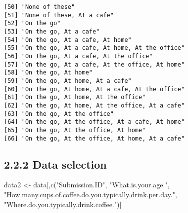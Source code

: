 \documentclass[
  letterpaper,
  DIV=11,
  numbers=noendperiod]{scrreprt}
\newenvironment{Shaded}{\begin{snugshade}}{\end{snugshade}}
\newcommand{\FunctionTok}[1]{\textcolor[rgb]{0.28,0.35,0.67}{#1}}
\newcommand{\NormalTok}[1]{\textcolor[rgb]{0.00,0.23,0.31}{#1}}
\newcommand{\OtherTok}[1]{\textcolor[rgb]{0.00,0.23,0.31}{#1}}
\newcommand{\SpecialCharTok}[1]{\textcolor[rgb]{0.37,0.37,0.37}{#1}}
\newcommand{\StringTok}[1]{\textcolor[rgb]{0.13,0.47,0.30}{#1}}
\begin{document}
\begin{verbatim}
[50] "None of these"                               
[51] "None of these, At a cafe"                    
[52] "On the go"                                   
[53] "On the go, At a cafe"                        
[54] "On the go, At a cafe, At home"               
[55] "On the go, At a cafe, At home, At the office"
[56] "On the go, At a cafe, At the office"         
[57] "On the go, At a cafe, At the office, At home"
[58] "On the go, At home"                          
[59] "On the go, At home, At a cafe"               
[60] "On the go, At home, At a cafe, At the office"
[61] "On the go, At home, At the office"           
[62] "On the go, At home, At the office, At a cafe"
[63] "On the go, At the office"                    
[64] "On the go, At the office, At a cafe, At home"
[65] "On the go, At the office, At home"           
[66] "On the go, At the office, At home, At a cafe"
\end{verbatim}

\hypertarget{data-selection}{%
\subsection{2.2.2 Data selection}\label{data-selection}}

\begin{Shaded}
\begin{Highlighting}[]
\NormalTok{data2 }\OtherTok{\textless{}{-}}\NormalTok{ data[,}\FunctionTok{c}\NormalTok{(}\StringTok{"Submission.ID"}\NormalTok{,}
                 \StringTok{"What.is.your.age."}\NormalTok{,}
                 \StringTok{"How.many.cups.of.coffee.do.you.typically.drink.per.day."}\NormalTok{,}
                 \StringTok{"Where.do.you.typically.drink.coffee."}\NormalTok{)] }
\end{Highlighting}
\end{Shaded}

\begin{Shaded}
\end{Shaded}
\end{document}

